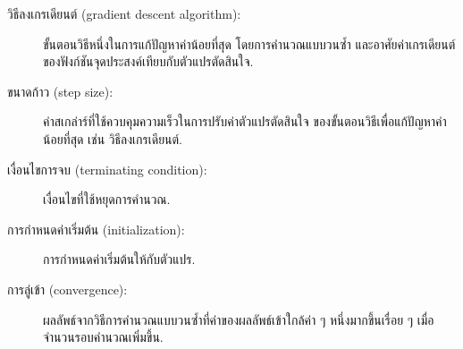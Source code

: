 \begin{description}
	\item[วิธีลงเกรเดียนต์ (gradient descent algorithm):]
	ขั้นตอนวิธีหนึ่งในการแก้ปัญหาค่าน้อยที่สุด
	โดยการคำนวณแบบวนซ้ำ และอาศัยค่าเกรเดียนต์ของฟังก์ชันจุดประสงค์เทียบกับตัวแปรตัดสินใจ.
	
	\item[ขนาดก้าว (step size):]
	ค่าสเกล่าร์ที่ใช้ควบคุมความเร็วในการปรับค่าตัวแปรตัดสินใจ ของขั้นตอนวิธีเพื่อแก้ปัญหาค่าน้อยที่สุด เช่น วิธีลงเกรเดียนต์.
	
	\item[เงื่อนไขการจบ (terminating condition):]
	เงื่อนไขที่ใช้หยุดการคำนวณ.

	\item[การกำหนดค่าเริ่มต้น (initialization):]
	การกำหนดค่าเริ่มต้นให้กับตัวแปร.
	
	\item[การลู่เข้า (convergence):]
	ผลลัพธ์จากวิธีการคำนวณแบบวนซ้ำที่ค่าของผลลัพธ์เข้าใกล้ค่า ๆ หนึ่งมากขึ้นเรื่อย ๆ เมื่อจำนวนรอบคำนวณเพิ่มขึ้น.
	
	
\end{description}





